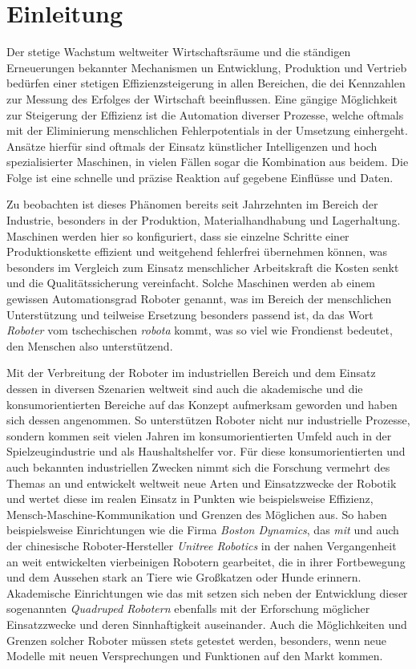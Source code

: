 \section{Einleitung}
\label{sec:einleitung}
Der stetige Wachstum weltweiter Wirtschaftsräume und die ständigen Erneuerungen bekannter Mechanismen un Entwicklung,
Produktion und Vertrieb bedürfen einer stetigen Effizienzsteigerung in allen Bereichen, die dei Kennzahlen zur Messung
des Erfolges der Wirtschaft beeinflussen.
Eine gängige Möglichkeit zur Steigerung der Effizienz ist die Automation diverser Prozesse, welche oftmals mit der Eliminierung
menschlichen Fehlerpotentials in der Umsetzung einhergeht.
Ansätze hierfür sind oftmals der Einsatz künstlicher Intelligenzen und hoch spezialisierter Maschinen, in vielen Fällen
sogar die Kombination aus beidem.
Die Folge ist eine schnelle und präzise Reaktion auf gegebene Einflüsse und Daten.

Zu beobachten ist dieses Phänomen bereits seit Jahrzehnten im Bereich der Industrie, besonders in der Produktion,
Materialhandhabung und Lagerhaltung.
Maschinen werden hier so konfiguriert, dass sie einzelne Schritte einer Produktionskette effizient und weitgehend fehlerfrei
übernehmen können, was besonders im Vergleich zum Einsatz menschlicher Arbeitskraft die Kosten senkt und die Qualitätssicherung
vereinfacht.
Solche Maschinen werden ab einem gewissen Automationsgrad Roboter genannt, was im Bereich der menschlichen Unterstützung
und teilweise Ersetzung besonders passend ist, da das Wort \emph{Roboter} vom tschechischen \emph{robota} kommt, was so viel wie
Frondienst bedeutet, den Menschen also unterstützend.

Mit der Verbreitung der Roboter im industriellen Bereich und dem Einsatz dessen in diversen Szenarien weltweit sind
auch die akademische und die konsumorientierten Bereiche auf das Konzept aufmerksam geworden und haben sich dessen angenommen.
So unterstützen Roboter nicht nur industrielle Prozesse, sondern kommen seit vielen Jahren im konsumorientierten
Umfeld auch in der Spielzeugindustrie und als Haushaltshelfer vor.
Für diese konsumorientierten und auch bekannten industriellen Zwecken nimmt sich die Forschung vermehrt des Themas an und
entwickelt weltweit neue Arten und Einsatzzwecke der Robotik und wertet diese im realen Einsatz in Punkten wie beispielsweise
Effizienz, Mensch-Maschine-Kommunikation und Grenzen des Möglichen aus.
So haben beispielsweise Einrichtungen wie die Firma \emph{Boston Dynamics}, das \emph{\gls{mit}} und auch der chinesische
Roboter-Hersteller \emph{Unitree Robotics} in der nahen Vergangenheit an weit entwickelten vierbeinigen Robotern
gearbeitet, die in ihrer Fortbewegung und dem Aussehen stark an Tiere wie Großkatzen oder Hunde erinnern.
Akademische Einrichtungen wie das \gls{mit} setzen sich neben der Entwicklung dieser sogenannten \emph{Quadruped Robotern}
ebenfalls mit der Erforschung möglicher Einsatzzwecke und deren Sinnhaftigkeit auseinander.
Auch die Möglichkeiten und Grenzen solcher Roboter müssen stets getestet werden, besonders, wenn neue Modelle mit neuen
Versprechungen und Funktionen auf den Markt kommen.

